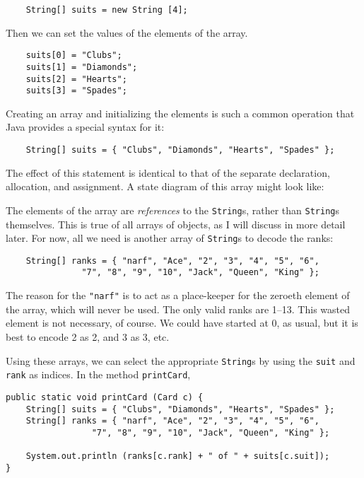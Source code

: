 \documentclass{book}
\newcommand{\beforefig}{\vspace{1.3\parskip}}
\newcommand{\afterfig}{\vspace{-0.2\parskip}}
\newcommand{\myfig}[1]{
    \beforefig
    \centerline{\epsfig{#1,scale=0.8}}
    \afterfig
}
\begin{document}
\begin{verbatim}
    String[] suits = new String [4];
\end{verbatim}
%
Then we can set the values of the elements of the array.

\begin{verbatim}
    suits[0] = "Clubs";
    suits[1] = "Diamonds";
    suits[2] = "Hearts";
    suits[3] = "Spades";
\end{verbatim}
%
Creating an array and initializing the elements is such a common
operation that Java provides a special syntax for it:

\begin{verbatim}
    String[] suits = { "Clubs", "Diamonds", "Hearts", "Spades" };
\end{verbatim}
%
The effect of this statement is identical to that of the
separate declaration, allocation, and assignment.  A state
diagram of this array might look like:

\myfig{figure=figs/stringarray.eps}


The elements of the array are {\em references} to the {\tt String}s,
rather than {\tt String}s themselves.  This is true of all arrays of
objects, as I will discuss in more detail later.  For now, all we need
is another array of {\tt String}s to decode the ranks:

\begin{verbatim}
    String[] ranks = { "narf", "Ace", "2", "3", "4", "5", "6",
               "7", "8", "9", "10", "Jack", "Queen", "King" };
\end{verbatim}
%
The reason for the {\tt "narf"} is to act as a place-keeper
for the zeroeth element of the array, which will never be
used.  The only valid ranks are 1--13.  This wasted element is not
necessary, of course.  We could have started at 0, as usual, but
it is best to encode 2 as 2, and 3 as 3, etc.

Using these arrays, we can select the appropriate {\tt String}s by
using the {\tt suit} and {\tt rank} as indices.  In the method
{\tt printCard},

\begin{verbatim}
public static void printCard (Card c) {
    String[] suits = { "Clubs", "Diamonds", "Hearts", "Spades" };
    String[] ranks = { "narf", "Ace", "2", "3", "4", "5", "6",
                 "7", "8", "9", "10", "Jack", "Queen", "King" };

    System.out.println (ranks[c.rank] + " of " + suits[c.suit]);
}
\end{verbatim}
\end{document}
